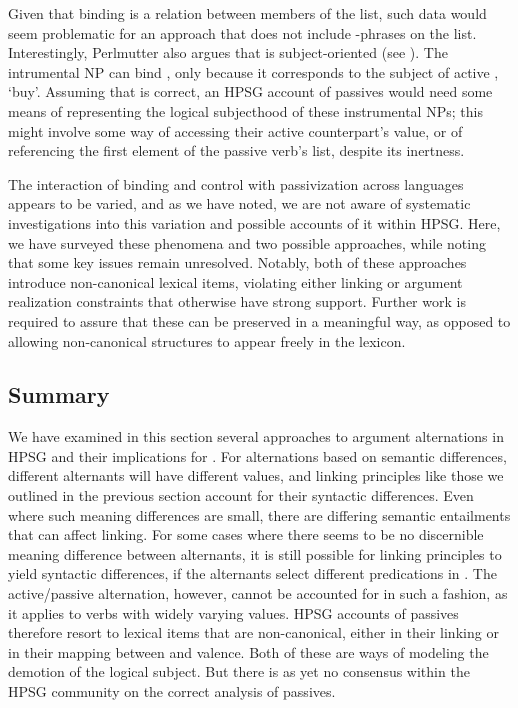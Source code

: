 \documentclass[output=paper
 	        ,biblatex
                ,babelshorthands
                ,newtxmath
                ,draftmode
                ,colorlinks, citecolor=brown
]{langscibook}
\begin{document}
\noindent
Given that binding is a relation between members of the \argst list, such data would seem problematic for an approach that does not include -phrases on the \argst list.
Interestingly, Perlmutter also argues that   is subject-oriented (see ).
The intrumental NP  can bind , only because it corresponds to the subject of active , `buy'.
Assuming that is correct, an HPSG account of  passives would need some means of representing the logical subjecthood of these instrumental NPs; this might involve some way of accessing their active counterpart's \subj value, or of referencing the first element of the passive verb's \argst list, despite its inertness.

The interaction of binding and control with passivization across languages appears to be varied, and as we have noted, we are not aware of systematic investigations into this variation and possible accounts of it within HPSG.
Here, we have surveyed these phenomena and two possible approaches, while noting that some key issues remain unresolved.
Notably, both of these approaches introduce non-canonical lexical items, violating either linking or argument realization constraints that otherwise have strong support. 
Further work is required to assure that these can be preserved in a meaningful way, as opposed to allowing non-canonical structures to appear freely in the lexicon.

\subsection{Summary}

We have examined in this section several approaches to argument alternations in HPSG and their implications for \argst.
For alternations based on semantic differences, different alternants will have different  values, and linking principles like those we outlined in the previous section account for their syntactic differences.
Even where such meaning differences are small, there are differing semantic entailments that can affect linking.
For some cases where there seems to be no discernible meaning difference between alternants, it is still possible for linking principles to yield syntactic differences, if the alternants select different  predications in .
The active/passive alternation, however, cannot be accounted for in such a fashion, as it applies to verbs with widely varying  values.
HPSG accounts of passives therefore resort to lexical items that are non-canonical, either in their linking or in their mapping between \argst and valence.
Both of these are ways of modeling the demotion of the logical subject.
But there is as yet no consensus within the HPSG community on the correct analysis of passives.
\end{document}
